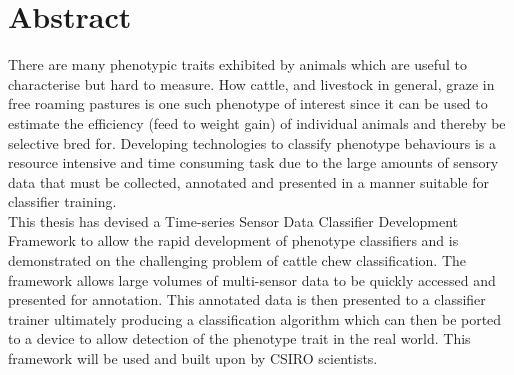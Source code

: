 \chapter{Abstract}

There are many phenotypic traits exhibited by animals which are useful to characterise but hard to measure. How cattle, and livestock in general, graze in free roaming pastures is one such phenotype of interest since it can be used to estimate the efficiency (feed to weight gain) of individual animals and thereby be selective bred for. Developing technologies to classify phenotype behaviours is a resource intensive and time consuming task due to the large amounts of sensory data that must be collected, annotated and presented in a manner suitable for classifier training.\\

This thesis has devised a Time-series Sensor Data Classifier Development Framework to allow the rapid development of phenotype classifiers and is demonstrated on the challenging problem of cattle chew classification. The framework allows large volumes of multi-sensor data to be quickly accessed and presented for annotation. This annotated data is then presented to a classifier trainer ultimately producing a classification algorithm which can then be ported to a device to allow detection of the phenotype trait in the real world. This framework will be used and built upon by CSIRO scientists.

